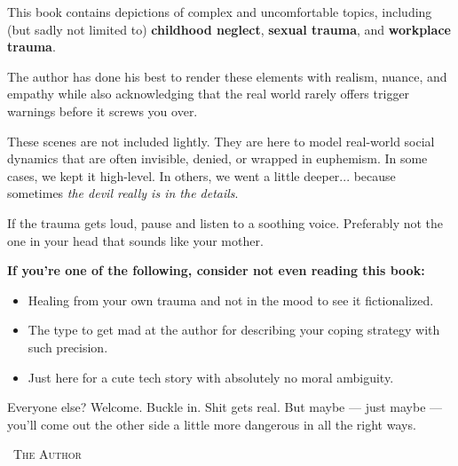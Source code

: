 \begin{tcolorbox}[
  enhanced,
  breakable,
  colback=white,
  colframe=red!70!black,
  coltitle=black,
  boxrule=1pt,
  arc=2mm,
  left=8mm,
  right=8mm,
  top=5mm,
  bottom=5mm,
  sharp corners=south,
  fonttitle=\LARGE\bfseries\sffamily,
  fontupper=\large\sffamily,
  title=\faExclamationTriangle\quad CONTENT WARNING: THIS BOOK MAY HURT (A LOT)
]

\bigskip

This book contains depictions of complex and uncomfortable topics, including (but sadly 
not limited to) \textbf{childhood neglect}, \textbf{sexual trauma}, and \textbf{workplace 
trauma}. 

\medskip

The author has done his best to render these elements with realism, nuance, and empathy
while also acknowledging that the real world rarely offers trigger warnings before 
it screws you over.

\medskip

These scenes are not included lightly. They are here to model real-world social dynamics 
that are often 
invisible, denied, or wrapped in euphemism. In some cases, we kept it high-level. In others, 
we went a little deeper... because sometimes \textit{the devil really is in the details}.

\medskip

If the trauma gets loud, pause and listen to a soothing voice. Preferably not the one in 
your head that sounds like your mother.

\medskip

\textbf{\large If you’re one of the following, consider not even reading this book:}

\begin{itemize}
  \item Healing from your own trauma and not in the mood to see it fictionalized.
  \item The type to get mad at the author for describing your coping strategy with such precision.
  \item Just here for a cute tech story with absolutely no moral ambiguity.
\end{itemize}

\medskip

Everyone else? Welcome. Buckle in. Shit gets real. But maybe --- just maybe --- you’ll come 
out the other side a little more dangerous in all the right ways.

\bigskip

\hfill\textemdash\ \textsc{The Author}

\end{tcolorbox}
